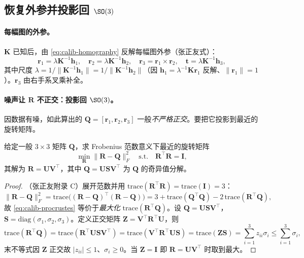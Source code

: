 \subsection{恢复外参并投影回 $\SO(3)$}
\label{sec:calib-extrinsics}

\paragraph{每幅图的外参。}
$\mathbf{K}$ 已知后，由 \cref{eq:calib-homography} 反解每幅图外参（张正友式\cite{zhang2000calibration}）：
\begin{equation}
  \mathbf{r}_1=\lambda\mathbf{K}^{-1}\mathbf{h}_1,\quad
  \mathbf{r}_2=\lambda\mathbf{K}^{-1}\mathbf{h}_2,\quad
  \mathbf{r}_3=\mathbf{r}_1\times\mathbf{r}_2,\quad
  \mathbf{t}=\lambda\mathbf{K}^{-1}\mathbf{h}_3,
  \label{eq:calib-extrinsics}
\end{equation}
其中尺度 $\lambda=1/\|\mathbf{K}^{-1}\mathbf{h}_1\|=1/\|\mathbf{K}^{-1}\mathbf{h}_2\|$（因 $\mathbf{h}_1=\lambda^{-1}\mathbf{K}\mathbf{r}_1$ 反解、$\|\mathbf{r}_1\|=1$）。$\mathbf{r}_3$ 由右手系叉乘补全。

\paragraph{噪声让 $\mathbf{R}$ 不正交：投影回 $\SO(3)$。}
因数据有噪，如此算出的 $\mathbf{Q}=[\mathbf{r}_1,\mathbf{r}_2,\mathbf{r}_3]$ 一般\emph{不严格正交}。要把它投影到最近的旋转矩阵。

\begin{theorem}\label{thm:calib-nearest-rotation}
给定一般 $3\times3$ 矩阵 $\mathbf{Q}$，求 Frobenius 范数意义下最近的旋转矩阵
\begin{equation}
  \min_{\mathbf{R}}\|\mathbf{R}-\mathbf{Q}\|_F^2\quad\text{s.t.}\quad \mathbf{R}^\top\mathbf{R}=\mathbf{I},
  \label{eq:calib-procrustes}
\end{equation}
其解为 $\mathbf{R}=\mathbf{U}\mathbf{V}^\top$，其中 $\mathbf{Q}=\mathbf{U}\mathbf{S}\mathbf{V}^\top$ 为 $\mathbf{Q}$ 的奇异值分解。
\end{theorem}
\begin{proof}
（张正友附录 C\cite{zhang2000calibration}）展开范数并用 $\mathrm{trace}(\mathbf{R}^\top\mathbf{R})=\mathrm{trace}(\mathbf{I})=3$：
\[
  \|\mathbf{R}-\mathbf{Q}\|_F^2=\mathrm{trace}\big((\mathbf{R}-\mathbf{Q})^\top(\mathbf{R}-\mathbf{Q})\big)=3+\mathrm{trace}(\mathbf{Q}^\top\mathbf{Q})-2\,\mathrm{trace}(\mathbf{R}^\top\mathbf{Q}),
\]
故 \cref{eq:calib-procrustes} 等价于\emph{最大化} $\mathrm{trace}(\mathbf{R}^\top\mathbf{Q})$。设 $\mathbf{Q}=\mathbf{U}\mathbf{S}\mathbf{V}^\top$，$\mathbf{S}=\mathrm{diag}(\sigma_1,\sigma_2,\sigma_3)$。定义正交矩阵 $\mathbf{Z}=\mathbf{V}^\top\mathbf{R}^\top\mathbf{U}$，则
\[
  \mathrm{trace}(\mathbf{R}^\top\mathbf{Q})=\mathrm{trace}(\mathbf{R}^\top\mathbf{U}\mathbf{S}\mathbf{V}^\top)=\mathrm{trace}(\mathbf{V}^\top\mathbf{R}^\top\mathbf{U}\mathbf{S})=\mathrm{trace}(\mathbf{Z}\mathbf{S})=\sum_{i=1}^3 z_{ii}\sigma_i\le\sum_{i=1}^3\sigma_i,
\]
末不等式因 $\mathbf{Z}$ 正交故 $|z_{ii}|\le1$、$\sigma_i\ge0$。当 $\mathbf{Z}=\mathbf{I}$ 即 $\mathbf{R}=\mathbf{U}\mathbf{V}^\top$ 时取到最大。
\end{proof}

